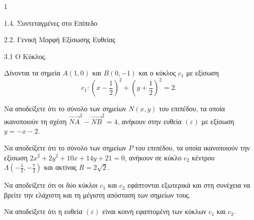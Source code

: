 \begin{ylh}{1}
    \item 1.4. Συντεταγμένες στο Επίπεδο
    \item 2.2. Γενική Μορφή Εξίσωσης Ευθείας
    \item 3.1 Ο Κύκλος.
\end{ylh}
Δίνονται τα σημεία $A(1,0)$ και $B(0,-1)$ και ο κύκλος $c_1$ με εξίσωση
\[
c_1: \left(x - \frac{1}{2}\right)^2 + \left(y + \frac{1}{2}\right)^2 = 2.
\]
\begin{alist}
\item Να αποδείξετε ότι το σύνολο των σημείων $N(x,y)$ του επιπέδου, τα οποία ικανοποιούν τη σχέση $\overrightarrow{NA}^2 - \overrightarrow{NB}^2 = 4$, ανήκουν στην ευθεία $(\varepsilon)$ με εξίσωση $y = -x - 2$. 
\item Να αποδείξετε ότι το σύνολο των σημείων $P$ του επιπέδου, τα οποία ικανοποιούν την εξίσωση $2x^2 + 2y^2 + 10x + 14y + 21 = 0$, ανήκουν σε κύκλο $c_2$ κέντρου $\Lambda\left(-\frac{5}{2}, -\frac{7}{2}\right)$ και ακτίνας $R = 2\sqrt{2}$. 
\item \begin{rlist}
    \item Να αποδείξετε ότι οι δύο κύκλοι $c_1$ και $c_2$ εφάπτονται εξωτερικά και στη συνέχεια να βρείτε την ελάχιστη και τη μέγιστη απόσταση των σημείων τους. 
    \item Να αποδείξετε ότι η ευθεία $(\varepsilon)$ είναι κοινή εφαπτομένη των κύκλων $c_1$ και $c_2$. 
\end{rlist}
\end{alist}
